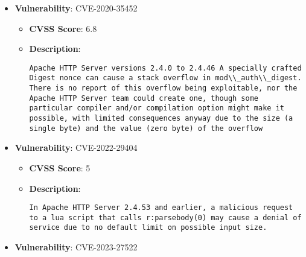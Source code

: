 \documentclass{article}
\begin{document}
\begin{itemize}
        \item \textbf{Vulnerability}: CVE-2020-35452
        \begin{itemize}
            \item \textbf{CVSS Score}:  6.8 
            \item \textbf{Description}:
            \parbox[t]{0.9\linewidth}{
                \verb|Apache HTTP Server versions 2.4.0 to 2.4.46 A specially crafted Digest nonce can cause a stack overflow in mod\\_auth\\_digest. There is no report of this overflow being exploitable, nor the Apache HTTP Server team could create one, though some particular compiler and/or compilation option might make it possible, with limited consequences anyway due to the size (a single byte) and the value (zero byte) of the overflow|
            }
        \end{itemize}
    
        \item \textbf{Vulnerability}: CVE-2022-29404
        \begin{itemize}
            \item \textbf{CVSS Score}:  5 
            \item \textbf{Description}:
            \parbox[t]{0.9\linewidth}{
                \verb|In Apache HTTP Server 2.4.53 and earlier, a malicious request to a lua script that calls r:parsebody(0) may cause a denial of service due to no default limit on possible input size.|
            }
        \end{itemize}
    
        \item \textbf{Vulnerability}: CVE-2023-27522
    

\end{itemize}
\end{document}
